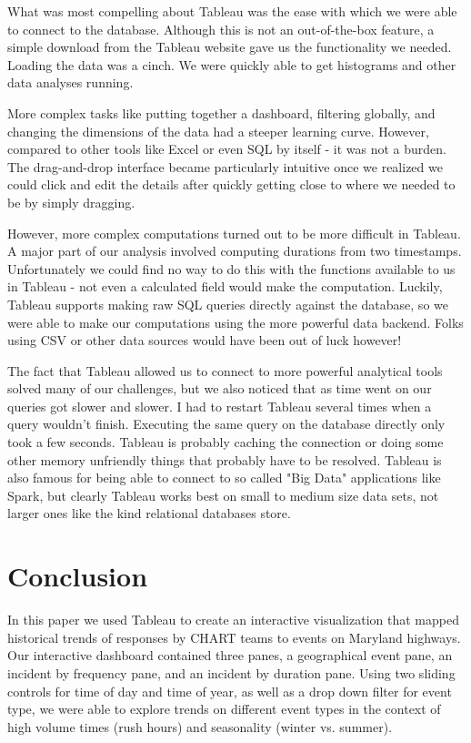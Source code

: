 \documentclass[11pt,letterpaper]{article}
\begin{document}
What was most compelling about Tableau was the ease with which we were able to connect to the database. Although this is not an out-of-the-box feature, a simple download from the Tableau website gave us the functionality we needed. Loading the data was a cinch. We were quickly able to get histograms and other data analyses running. 

More complex tasks like putting together a dashboard, filtering globally, and changing the dimensions of the data had a steeper learning curve. However, compared to other tools like Excel or even SQL by itself - it was not a burden. The drag-and-drop interface became particularly intuitive once we realized we could click and edit the details after quickly getting close to where we needed to be by simply dragging. 

However, more complex computations turned out to be more difficult in Tableau. A major part of our analysis involved computing durations from two timestamps. Unfortunately we could find no way to do this with the functions available to us in Tableau - not even a calculated field would make the computation. Luckily, Tableau supports making raw SQL queries directly against the database, so we were able to make our computations using the more powerful data backend. Folks using CSV or other data sources would have been out of luck however! 

The fact that Tableau allowed us to connect to more powerful analytical tools solved many of our challenges, but we also noticed that as time went on our queries got slower and slower. I had to restart Tableau several times when a query wouldn't finish. Executing the same query on the database directly only took a few seconds. Tableau is probably caching the connection or doing some other memory unfriendly things that probably have to be resolved. Tableau is also famous for being able to connect to so called "Big Data" applications like Spark, but clearly Tableau works best on small to medium size data sets, not larger ones like the kind relational databases store. 

\section*{Conclusion}

In this paper we used Tableau to create an interactive visualization that mapped historical trends of responses by CHART teams to events on Maryland highways. Our interactive dashboard contained three panes, a geographical event pane, an incident by frequency pane, and an incident by duration pane. Using two sliding controls for time of day and time of year, as well as a drop down filter for event type, we were able to explore trends on different event types in the context of high volume times (rush hours) and seasonality (winter vs. summer). 



\end{document}
